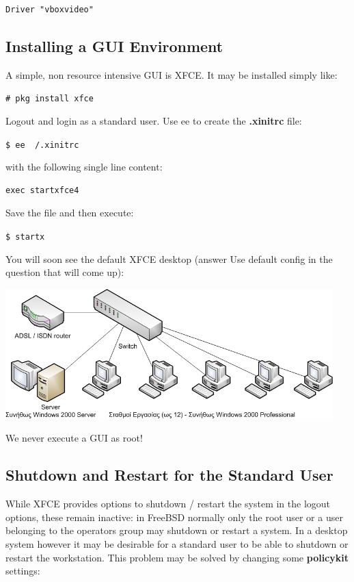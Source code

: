 \documentclass[a4paper,twoside,12pt]{article}
\newcommand{\coderoot}[1]{\texttt{\# #1}}
\newcommand{\codeuser}[1]{\texttt{\$ #1}}
\begin{document}
\begin{verbatim}
Driver "vboxvideo"
\end{verbatim}

\subsection{Installing a GUI Environment}
A simple, non resource intensive GUI is XFCE. It may be installed simply like:

\coderoot{pkg install xfce}

Logout and login as a standard user. Use ee to create the \textbf{.xinitrc} file:

\codeuser{ee ~/.xinitrc}

with the following single line content:

\begin{verbatim}
exec startxfce4
\end{verbatim}

Save the file and then execute:

\codeuser{startx}

You will soon see the default XFCE desktop (answer Use default config in the question that will come up):

\begin{center}
\includegraphics[width=0.95\textwidth]{images/main/school-lab}
\end{center}

We never execute a GUI as root!

\subsection{Shutdown and Restart for the Standard User}
While XFCE provides options to shutdown / restart the system in the logout options, these remain inactive: in FreeBSD normally only the root user or a user belonging to the operators group may shutdown or restart a system. In a desktop system however it may be desirable for a standard user to be able to shutdown or restart the workstation. This problem may be solved by changing some \textbf{policykit} settings:
\end{document}
